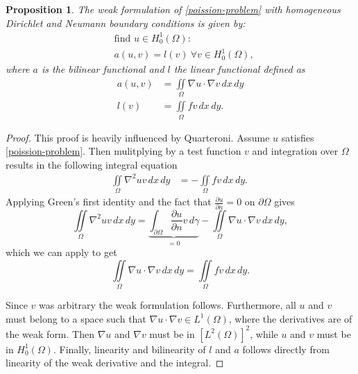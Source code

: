 \documentclass[a4paper,english]{elsarticle}%
\newtheorem{proposition}[theorem]{Proposition}
\begin{document}
\begin{proposition}
    The weak formulation of \eqref{poission-problem} with homogeneous Dirichlet and Neumann boundary conditions is given by:  
    \begin{equation*}
        \begin{aligned}
        &\text{find } u \in H_0^{1}(\Omega) : 
        \\
        &a(u,v) = l(v) \ \forall v \in H_0^{1}(\Omega), 
        \end{aligned}
    \end{equation*}
    where $a$ is the bilinear functional and $l$ the linear functional defined as 
    \begin{equation*}
        \begin{aligned}
            a(u,v) &= \iint\limits_{\Omega} \nabla u \cdot \nabla v \, dx \, dy
            \\
            l(v) &= \iint\limits_{\Omega} fv \, dx \, dy.
        \end{aligned}
    \end{equation*}
\end{proposition}
\begin{proof}
    This proof is heavily influenced by Quarteroni\cite[p. 44-45]{AQuart}.
    Assume $u$ satisfies \eqref{poission-problem}. Then mulitplying by a test function $v$ and integration over $\Omega$ results in the following integral equation
    \begin{equation}
        \label{weak-start}
        \begin{aligned}
            \iint\limits_{\Omega} \nabla^2uv \, dx \, dy &=  -\iint\limits_{\Omega} fv \, dx \, dy.\ 
        \end{aligned}
    \end{equation}
    Applying Green's first identity and the fact that $\frac{\partial u}{\partial n} = 0$ on $\partial \Omega$ gives
    \begin{equation}
        \iint\limits_{\Omega} \nabla^2 u v \, dx \, dy 
        = \underbrace{\int_{\partial \Omega} \frac{\partial u}{\partial n} v \, d\gamma}_{=0} - \iint\limits_{\Omega} \nabla u \cdot \nabla v  \, dx \, dy,
        \label{greens-identety}
    \end{equation}
    which we can apply to get 
    \begin{equation}
        \iint\limits_{\Omega} \nabla u \cdot \nabla v \, dx \, dy = 
        \iint\limits_{\Omega} fv \, dx \, dy.
    \end{equation}
    
    Since $v$ was arbitrary the weak formulation follows. Furthermore, all $u$ and $v$ must belong to a space such that $\nabla u \cdot \nabla v \in {L^1}(\Omega)$, where the derivatives are of the weak form. Then $\nabla u$ and $\nabla v$ must be in $\left[{L^2}(\Omega)\right]^2$, while $u$ and $v$ must be in ${H^1_0}(\Omega)$. Finally, linearity and bilinearity of $l$ and $a$ follows directly from linearity of the weak derivative and the integral.
\end{proof}
\end{document}
